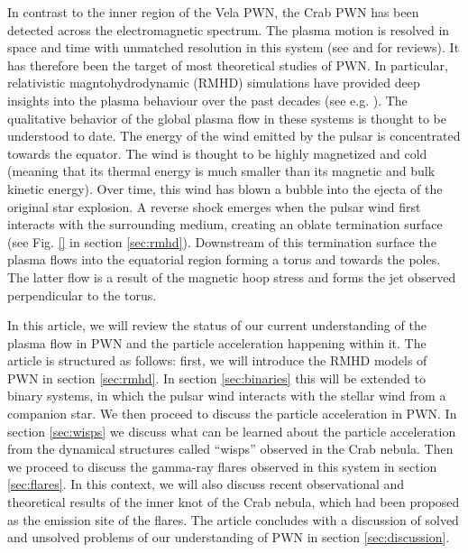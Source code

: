 In contrast to the inner region of the Vela PWN, the Crab PWN has been detected across the electromagnetic spectrum. The plasma motion is resolved in space and time with unmatched resolution in this system (see \citep{Hester_2008} and \citep{BuehlerBlandford2013a} for reviews). It has therefore been the target of most theoretical studies of PWN. In particular, relativistic magntohydrodynamic (RMHD) simulations have provided deep insights into the plasma behaviour over the past decades (see e.g.  \citep{Komissarov_2004,Del_Zanna_2006,Porth_2013}). The qualitative behavior of the global plasma flow in these systems is thought to be understood to date. The energy of the wind emitted by the pulsar is concentrated towards the equator. The wind is thought to be highly magnetized and cold (meaning that its thermal energy is much smaller than its magnetic and bulk kinetic energy). Over time, this wind has blown a bubble into the ejecta of the original star explosion. A reverse shock emerges when the pulsar wind first interacts with the surrounding medium, creating an oblate termination surface (see {\cred Fig. \ref{}} in section \ref{sec:rmhd}). Downstream of this termination surface the plasma flows into the equatorial region forming a torus and towards the poles. The latter flow is a result of the magnetic hoop stress and forms the jet observed perpendicular to the torus.

In this article, we will review the status of our current understanding of the plasma flow in PWN and the particle acceleration happening within it.  The article is structured as follows: first, we will introduce the RMHD models of PWN in section \ref{sec:rmhd}. In section \ref{sec:binaries} this will be extended to binary systems, in which the pulsar wind interacts with the stellar wind from a companion star. We then proceed to discuss the particle acceleration in PWN. In section \ref{sec:wisps} we discuss what can be learned about the particle acceleration from the dynamical structures called ``wisps'' observed in the Crab nebula. Then we proceed to discuss the gamma-ray flares observed in this system in section \ref{sec:flares}. In this context, we will also discuss recent observational and theoretical results of the inner knot of the Crab nebula, which had been proposed as the emission site of the flares. The article concludes with a discussion of solved and unsolved problems of our understanding of PWN in section \ref{sec:discussion}.